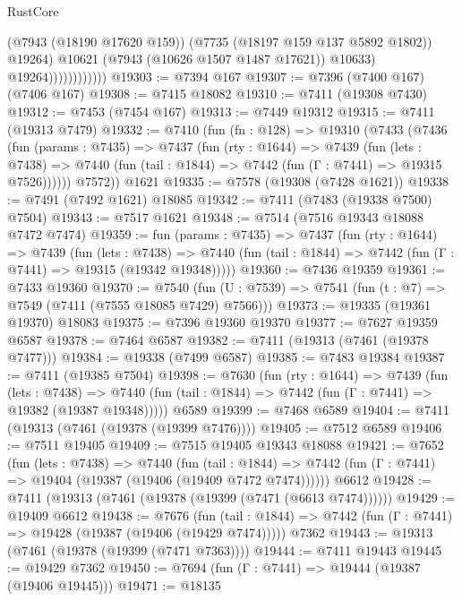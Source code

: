 \begin{lexlean}{RustCore}
\begin{coremodule}
                                (@7943 (@18190 @17620 @159))
                                (@7735 (@18197 @159 @137 @5892 @1802))
                                @19264)
                              @10621
                              (@7943 (@10626 @1507 @1487 @17621))
                              @10633)
                            @19264))))))))))))
@19303 := @7394 @167
@19307 := @7396 (@7400 @167) (@7406 @167)
@19308 := @7415 @18082
@19310 := @7411 (@19308 @7430)
@19312 := @7453 (@7454 @167)
@19313 := @7449 @19312
@19315 := @7411 (@19313 @7479)
@19332 := @7410
    (fun (fn : @128) =>
    @19310
      (@7433
        (@7436
          (fun (params : @7435) =>
          @7437
            (fun (rty : @1644) =>
            @7439
              (fun (lets : @7438) =>
              @7440 (fun (tail : @1844) => @7442 (fun (Γ : @7441) => @19315 @7526))))))
        @7572))
    @1621
@19335 := @7578 (@19308 (@7428 @1621))
@19338 := @7491 (@7492 @1621) @18085
@19342 := @7411 (@7483 (@19338 @7500) @7504)
@19343 := @7517 @1621
@19348 := @7514 (@7516 @19343 @18088 @7472 @7474)
@19359 := fun (params : @7435) =>
  @7437
    (fun (rty : @1644) =>
    @7439
      (fun (lets : @7438) =>
      @7440 (fun (tail : @1844) => @7442 (fun (Γ : @7441) => @19315 (@19342 @19348)))))
@19360 := @7436 @19359
@19361 := @7433 @19360
@19370 := @7540
    (fun (U : @7539) => @7541 (fun (t : @7) => @7549 (@7411 (@7555 @18085 @7429) @7566)))
@19373 := @19335 (@19361 @19370) @18083
@19375 := @7396 @19360 @19370
@19377 := @7627 @19359 @6587
@19378 := @7464 @6587
@19382 := @7411 (@19313 (@7461 (@19378 @7477)))
@19384 := @19338 (@7499 @6587)
@19385 := @7483 @19384
@19387 := @7411 (@19385 @7504)
@19398 := @7630
    (fun (rty : @1644) =>
    @7439
      (fun (lets : @7438) =>
      @7440 (fun (tail : @1844) => @7442 (fun (Γ : @7441) => @19382 (@19387 @19348)))))
    @6589
@19399 := @7468 @6589
@19404 := @7411 (@19313 (@7461 (@19378 (@19399 @7476))))
@19405 := @7512 @6589
@19406 := @7511 @19405
@19409 := @7515 @19405 @19343 @18088
@19421 := @7652
    (fun (lets : @7438) =>
    @7440
      (fun (tail : @1844) =>
      @7442 (fun (Γ : @7441) => @19404 (@19387 (@19406 (@19409 @7472 @7474))))))
    @6612
@19428 := @7411 (@19313 (@7461 (@19378 (@19399 (@7471 (@6613 @7474))))))
@19429 := @19409 @6612
@19438 := @7676
    (fun (tail : @1844) => @7442 (fun (Γ : @7441) => @19428 (@19387 (@19406 (@19429 @7474)))))
    @7362
@19443 := @19313 (@7461 (@19378 (@19399 (@7471 @7363))))
@19444 := @7411 @19443
@19445 := @19429 @7362
@19450 := @7694 (fun (Γ : @7441) => @19444 (@19387 (@19406 @19445)))
@19471 := @18135

\end{coremodule}
\end{lexlean}
